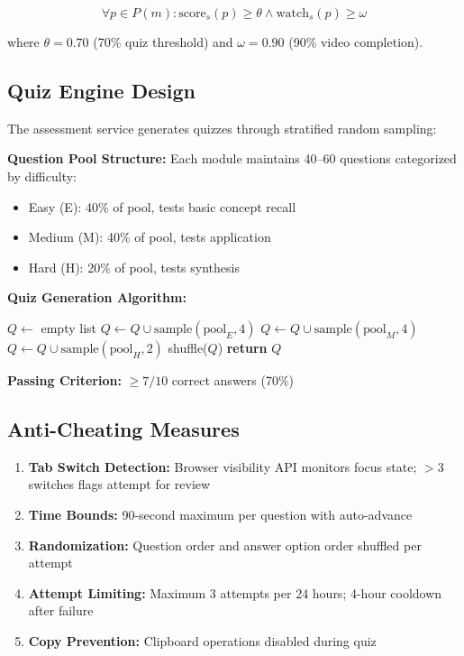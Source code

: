 \documentclass[journal]{IEEEtran}
\begin{document}
\begin{equation}
\forall p \in P(m) : \text{score}_s(p) \geq \theta \land \text{watch}_s(p) \geq \omega
\end{equation}

where $\theta = 0.70$ (70\% quiz threshold) and $\omega = 0.90$ (90\% video completion).

\subsection{Quiz Engine Design}

The assessment service generates quizzes through stratified random sampling:

\textbf{Question Pool Structure:}
Each module maintains 40--60 questions categorized by difficulty:
\begin{itemize}
    \item Easy (E): 40\% of pool, tests basic concept recall
    \item Medium (M): 40\% of pool, tests application
    \item Hard (H): 20\% of pool, tests synthesis
\end{itemize}

\textbf{Quiz Generation Algorithm:}
\begin{algorithmic}
\STATE $Q \leftarrow$ empty list
\STATE $Q \leftarrow Q \cup \text{sample}(\text{pool}_E, 4)$
\STATE $Q \leftarrow Q \cup \text{sample}(\text{pool}_M, 4)$
\STATE $Q \leftarrow Q \cup \text{sample}(\text{pool}_H, 2)$
\STATE shuffle($Q$)
\STATE \textbf{return} $Q$
\end{algorithmic}

\textbf{Passing Criterion:} $\geq 7/10$ correct answers (70\%)

\subsection{Anti-Cheating Measures}

\begin{enumerate}
    \item \textbf{Tab Switch Detection:} Browser visibility API monitors focus state; $>3$ switches flags attempt for review
    \item \textbf{Time Bounds:} 90-second maximum per question with auto-advance
    \item \textbf{Randomization:} Question order and answer option order shuffled per attempt
    \item \textbf{Attempt Limiting:} Maximum 3 attempts per 24 hours; 4-hour cooldown after failure
    \item \textbf{Copy Prevention:} Clipboard operations disabled during quiz
\end{enumerate}
\end{document}
